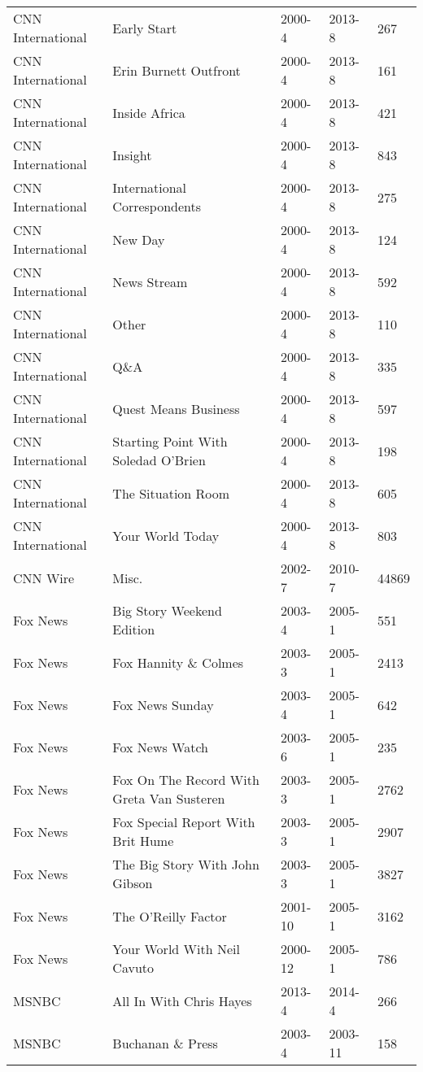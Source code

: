 \begin{longtable}{lllll}
  CNN International & Early Start & 2000-4 & 2013-8 & 267 \\ 
  CNN International & Erin Burnett Outfront & 2000-4 & 2013-8 & 161 \\ 
  CNN International & Inside Africa & 2000-4 & 2013-8 & 421 \\ 
  CNN International & Insight & 2000-4 & 2013-8 & 843 \\ 
  CNN International & International Correspondents & 2000-4 & 2013-8 & 275 \\ 
  CNN International & New Day & 2000-4 & 2013-8 & 124 \\ 
  CNN International & News Stream & 2000-4 & 2013-8 & 592 \\ 
  CNN International & Other & 2000-4 & 2013-8 & 110 \\ 
  CNN International & Q\&A & 2000-4 & 2013-8 & 335 \\ 
  CNN International & Quest Means Business & 2000-4 & 2013-8 & 597 \\ 
  CNN International & Starting Point With Soledad O'Brien & 2000-4 & 2013-8 & 198 \\ 
  CNN International & The Situation Room & 2000-4 & 2013-8 & 605 \\ 
  CNN International & Your World Today & 2000-4 & 2013-8 & 803 \\ 
  CNN Wire & Misc. & 2002-7 & 2010-7 & 44869 \\ 
  Fox News & Big Story Weekend Edition & 2003-4 & 2005-1 & 551 \\ 
  Fox News & Fox Hannity \& Colmes & 2003-3 & 2005-1 & 2413 \\ 
  Fox News & Fox News Sunday & 2003-4 & 2005-1 & 642 \\ 
  Fox News & Fox News Watch & 2003-6 & 2005-1 & 235 \\ 
  Fox News & Fox On The Record With Greta Van Susteren & 2003-3 & 2005-1 & 2762 \\ 
  Fox News & Fox Special Report With Brit Hume & 2003-3 & 2005-1 & 2907 \\ 
  Fox News & The Big Story With John Gibson & 2003-3 & 2005-1 & 3827 \\ 
  Fox News & The O'Reilly Factor & 2001-10 & 2005-1 & 3162 \\ 
  Fox News & Your World With Neil Cavuto & 2000-12 & 2005-1 & 786 \\ 
  MSNBC & All In With Chris Hayes & 2013-4 & 2014-4 & 266 \\ 
  MSNBC & Buchanan \& Press & 2003-4 & 2003-11 & 158 \\ 

\end{longtable}
